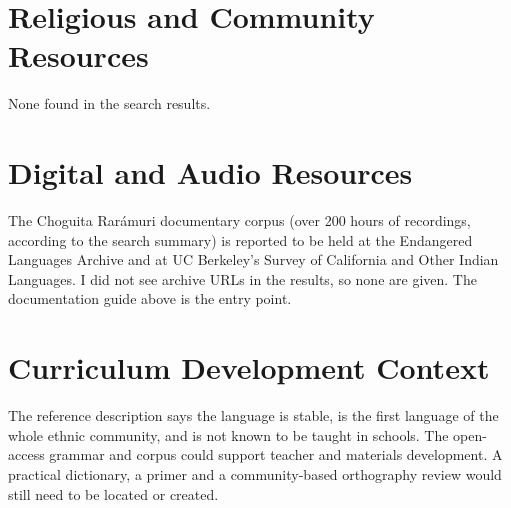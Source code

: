 \documentclass[12pt]{article}
\begin{document}
\section{Religious and Community Resources}
None found in the search results.

\section{Digital and Audio Resources}
The Choguita Rar\'amuri documentary corpus (over 200 hours of recordings, according to the search summary) is reported to be held at the Endangered Languages Archive and at UC Berkeley's Survey of California and Other Indian Languages. I did not see archive URLs in the results, so none are given. The documentation guide above is the entry point.

\section{Curriculum Development Context}
The reference description says the language is stable, is the first language of the whole ethnic community, and is not known to be taught in schools. The open-access grammar and corpus could support teacher and materials development. A practical dictionary, a primer and a community-based orthography review would still need to be located or created.
\end{document}
